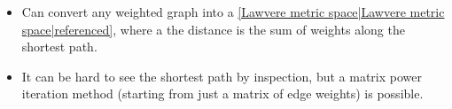 \begin{itemize}
    \item Can convert any weighted graph into a \ref{Lawvere metric space|Lawvere metric space|referenced}, where a the distance is the sum of weights along the shortest path.
    \item It can be hard to see the shortest path by inspection, but a matrix power iteration method (starting from just a matrix of edge weights) is possible.
  \end{itemize}
